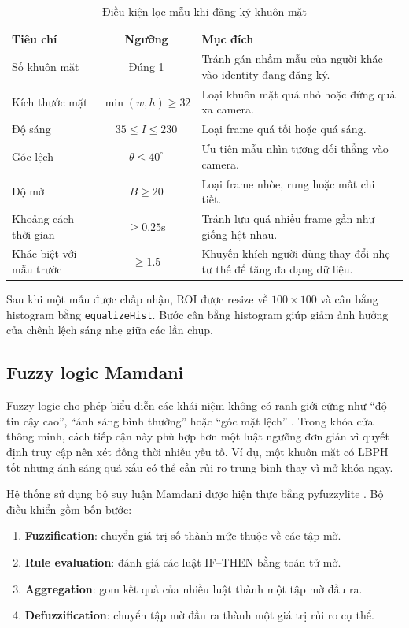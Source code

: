 \begin{table}[H]
\centering
\caption{Điều kiện lọc mẫu khi đăng ký khuôn mặt}
\label{tab:registration_quality}
\begin{tabular}{|l|c|p{7cm}|}
\hline
\textbf{Tiêu chí} & \textbf{Ngưỡng} & \textbf{Mục đích} \\
\hline
Số khuôn mặt & Đúng 1 & Tránh gán nhầm mẫu của người khác vào identity đang đăng ký. \\
\hline
Kích thước mặt & $\min(w,h) \ge 32$ & Loại khuôn mặt quá nhỏ hoặc đứng quá xa camera. \\
\hline
Độ sáng & $35 \le I \le 230$ & Loại frame quá tối hoặc quá sáng. \\
\hline
Góc lệch & $\theta \le 40^\circ$ & Ưu tiên mẫu nhìn tương đối thẳng vào camera. \\
\hline
Độ mờ & $B \ge 20$ & Loại frame nhòe, rung hoặc mất chi tiết. \\
\hline
Khoảng cách thời gian & $\ge 0.25$s & Tránh lưu quá nhiều frame gần như giống hệt nhau. \\
\hline
Khác biệt với mẫu trước & $\ge 1.5$ & Khuyến khích người dùng thay đổi nhẹ tư thế để tăng đa dạng dữ liệu. \\
\hline
\end{tabular}
\end{table}

Sau khi một mẫu được chấp nhận, ROI được resize về $100\times100$ và cân bằng histogram bằng \texttt{equalizeHist}. Bước cân bằng histogram giúp giảm ảnh hưởng của chênh lệch sáng nhẹ giữa các lần chụp.

\subsection{Fuzzy logic Mamdani}

Fuzzy logic cho phép biểu diễn các khái niệm không có ranh giới cứng như ``độ tin cậy cao'', ``ánh sáng bình thường'' hoặc ``góc mặt lệch'' \cite{zadeh1965}. Trong khóa cửa thông minh, cách tiếp cận này phù hợp hơn một luật ngưỡng đơn giản vì quyết định truy cập nên xét đồng thời nhiều yếu tố. Ví dụ, một khuôn mặt có LBPH tốt nhưng ánh sáng quá xấu có thể cần rủi ro trung bình thay vì mở khóa ngay.

Hệ thống sử dụng bộ suy luận Mamdani \cite{mamdani1975} được hiện thực bằng pyfuzzylite \cite{fuzzylite}. Bộ điều khiển gồm bốn bước:

\begin{enumerate}
    \item \textbf{Fuzzification}: chuyển giá trị số thành mức thuộc về các tập mờ.
    \item \textbf{Rule evaluation}: đánh giá các luật IF--THEN bằng toán tử mờ.
    \item \textbf{Aggregation}: gom kết quả của nhiều luật thành một tập mờ đầu ra.
    \item \textbf{Defuzzification}: chuyển tập mờ đầu ra thành một giá trị rủi ro cụ thể.
\end{enumerate}

